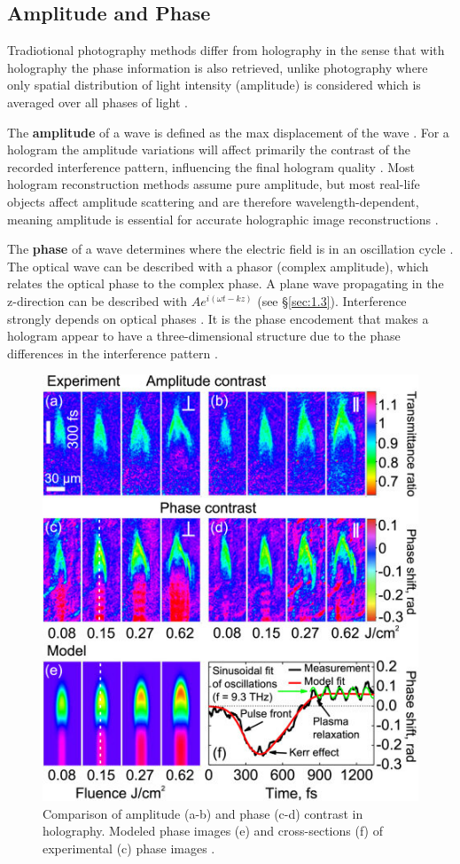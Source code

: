 \documentclass[12pt]{article}
\begin{document}
\subsection{Amplitude and Phase} \label{sec:1.2}

Tradiotional photography methods differ from holography in the sense that with holography the phase information is also retrieved, unlike photography where only spatial distribution of light intensity (amplitude) is considered which
is averaged over all phases of light \cite{collier2013optical}.

The \textbf{amplitude} of a wave is defined as the max displacement of the wave \cite{britlight}.
For a hologram the amplitude variations will affect primarily the contrast of the recorded interference pattern, influencing the final hologram quality \cite{UCDholo,latychevskaia2009simultaneous}.
Most hologram reconstruction methods assume pure amplitude, but most real-life objects affect amplitude scattering and are therefore wavelength-dependent, 
meaning amplitude is essential for accurate holographic image reconstructions \cite{latychevskaia2009simultaneous}.

The \textbf{phase} of a wave determines where the electric field is in an oscillation cycle \cite{Paschotta_2018_optical_phase}.
The optical wave can be described with a phasor (complex amplitude), which relates the optical phase to the complex phase. 
A plane wave propagating in the z-direction can be described with $Ae^{i(\omega t - kz)}$ (see §\ref{sec:1.3}).
Interference strongly depends on optical phases \cite{Paschotta_2018_optical_phase}.
It is the phase encodement that makes a hologram appear to have a three-dimensional structure due to the phase differences in the interference pattern \cite{Paschotta_2018_optical_phase}.

\begin{figure}[H]
    \centering
    \includegraphics[width=.5\textwidth]{amplitude v phase contrast.jpg}
    \caption{\centering Comparison of amplitude (a-b) and phase (c-d) contrast in holography. Modeled phase images (e) and cross-sections (f) of experimental (c) phase images \protect\cite{ampvphaseimg}.}
    \label{fig:6}
\end{figure}
\end{document}
